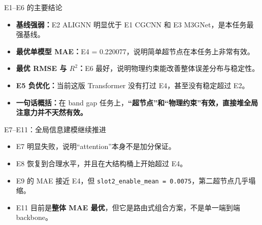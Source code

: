 \documentclass{beamer}
\begin{document}
\begin{frame}{E1--E6 的主要结论}
\small
\begin{itemize}
  \item \textbf{基线强弱：}E2 ALIGNN 明显优于 E1 CGCNN 和 E3 M3GNet，是本任务最强基线。
  \item \textbf{最优单模型 MAE：}E4 = 0.220077，说明简单超节点在本任务上非常有效。
  \item \textbf{最优 RMSE 与 $R^2$：}E6 最好，说明物理约束能改善整体误差分布与稳定性。
  \item \textbf{E5 负优化：}当前这版 Transformer 没有打过 E4，甚至没有稳定超过 E2。
  \item \textbf{一句话概括：}在 band gap 任务上，\textbf{“超节点”和“物理约束”有效，直接堆全局注意力并不天然有效。}
\end{itemize}
\end{frame}

\begin{frame}{E7--E11：全局信息建模继续推进}
\scriptsize
\centering
{}

\vspace{2mm}
\small
\begin{itemize}
  \item E7 明显失败，说明“attention”本身不是加分保证。
  \item E8 恢复到合理水平，并且在大结构桶上开始超过 E4。
  \item E9 的 MAE 接近 E4，但 \texttt{slot2\_enable\_mean = 0.0075}，第二超节点几乎塌缩。
  \item E11 目前是\textbf{整体 MAE 最优}，但它是路由式组合方案，不是单一端到端 backbone。
\end{itemize}
\end{frame}
\end{document}
